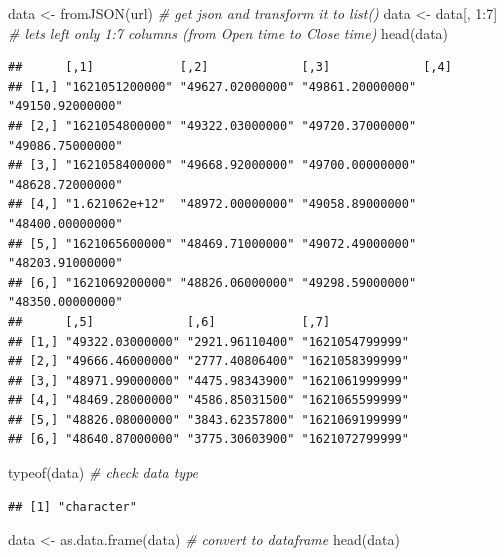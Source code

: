 \documentclass[
]{book}
\newenvironment{Shaded}{\begin{snugshade}}{\end{snugshade}}
\newcommand{\CommentTok}[1]{\textcolor[rgb]{0.56,0.35,0.01}{\textit{#1}}}
\newcommand{\DecValTok}[1]{\textcolor[rgb]{0.00,0.00,0.81}{#1}}
\newcommand{\FunctionTok}[1]{\textcolor[rgb]{0.00,0.00,0.00}{#1}}
\newcommand{\NormalTok}[1]{#1}
\newcommand{\OtherTok}[1]{\textcolor[rgb]{0.56,0.35,0.01}{#1}}
\newcommand{\SpecialCharTok}[1]{\textcolor[rgb]{0.00,0.00,0.00}{#1}}
\begin{document}
\begin{Shaded}
\begin{Highlighting}[]
\NormalTok{data }\OtherTok{\textless{}{-}} \FunctionTok{fromJSON}\NormalTok{(url) }\CommentTok{\# get json and transform it to list()}
\NormalTok{data }\OtherTok{\textless{}{-}}\NormalTok{ data[, }\DecValTok{1}\SpecialCharTok{:}\DecValTok{7}\NormalTok{] }\CommentTok{\# let\textquotesingle{}s left only 1:7 columns (from Open time to Close time)}
\FunctionTok{head}\NormalTok{(data)}
\end{Highlighting}
\end{Shaded}

\begin{verbatim}
##      [,1]            [,2]             [,3]             [,4]            
## [1,] "1621051200000" "49627.02000000" "49861.20000000" "49150.92000000"
## [2,] "1621054800000" "49322.03000000" "49720.37000000" "49086.75000000"
## [3,] "1621058400000" "49668.92000000" "49700.00000000" "48628.72000000"
## [4,] "1.621062e+12"  "48972.00000000" "49058.89000000" "48400.00000000"
## [5,] "1621065600000" "48469.71000000" "49072.49000000" "48203.91000000"
## [6,] "1621069200000" "48826.06000000" "49298.59000000" "48350.00000000"
##      [,5]             [,6]            [,7]           
## [1,] "49322.03000000" "2921.96110400" "1621054799999"
## [2,] "49666.46000000" "2777.40806400" "1621058399999"
## [3,] "48971.99000000" "4475.98343900" "1621061999999"
## [4,] "48469.28000000" "4586.85031500" "1621065599999"
## [5,] "48826.08000000" "3843.62357800" "1621069199999"
## [6,] "48640.87000000" "3775.30603900" "1621072799999"
\end{verbatim}

\begin{Shaded}
\begin{Highlighting}[]
\FunctionTok{typeof}\NormalTok{(data) }\CommentTok{\# check data type}
\end{Highlighting}
\end{Shaded}

\begin{verbatim}
## [1] "character"
\end{verbatim}

\begin{Shaded}
\begin{Highlighting}[]
\NormalTok{data }\OtherTok{\textless{}{-}} \FunctionTok{as.data.frame}\NormalTok{(data) }\CommentTok{\# convert to dataframe}
\FunctionTok{head}\NormalTok{(data)}
\end{Highlighting}
\end{Shaded}
\end{document}
